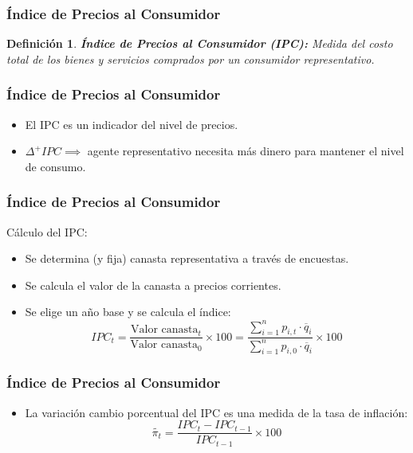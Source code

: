\documentclass[dvipsnames,table,leqno]{beamer}
\newtheorem{mydef}{Definición}
\newcommand{\peq}[1]{{\scriptscriptstyle{#1}}}
\begin{document}
		\begin{frame}
			\frametitle{Índice de Precios al Consumidor}
			\begin{mydef}
				\textbf{Índice de Precios al Consumidor (IPC):} Medida del costo total de los bienes y servicios comprados por un consumidor representativo.
			\end{mydef}
		\end{frame}		

		\begin{frame}
			\frametitle{Índice de Precios al Consumidor}
			\begin{itemize}
				\item El IPC es un indicador del nivel de precios.
				\item$\Delta^\peq{+}IPC\implies$ agente representativo necesita más dinero para mantener el nivel de consumo.
			\end{itemize}
		\end{frame}		

		\begin{frame}
			\frametitle{Índice de Precios al Consumidor}
			Cálculo del IPC:
			\begin{itemize}
				\item Se determina (y fija) canasta representativa a través de encuestas.
				\item Se calcula el valor de la canasta a precios corrientes.
				\item Se elige un año base y se calcula el índice: $$IPC_\peq{t}=\frac{\text{Valor canasta}_\peq{t}}{\text{Valor canasta}_\peq{0}}\times100=\frac{\sum\limits_\peq{i=1}^\peq{n}{p_\peq{i,t}\cdot\overline{q}_\peq{i}}}{\sum\limits_\peq{i=1}^\peq{n}{p_\peq{i,0}\cdot\overline{q}_\peq{i}}}\times100$$
			\end{itemize}
		\end{frame}
				
	\begin{frame}
			\frametitle{Índice de Precios al Consumidor}
			\begin{itemize}
				\item La variación cambio porcentual del IPC es una medida de la tasa de inflación: $$\tilde{\pi_\peq{t}}=\frac{IPC_\peq{t}-IPC_\peq{t-1}}{IPC_\peq{t-1}}\times100$$
			\end{itemize}
		\end{frame}
\end{document}
